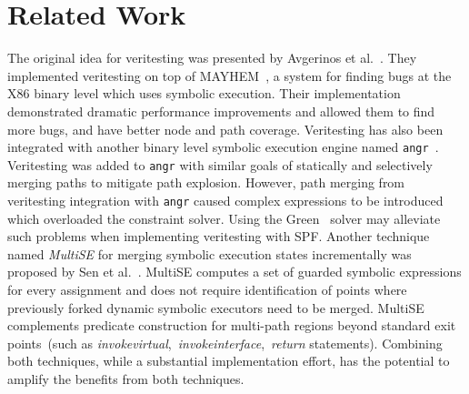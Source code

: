 \section{Related Work}
%
The original idea for veritesting was presented by Avgerinos et al.~\cite{veritesting}.
%
They implemented veritesting on top of MAYHEM~\cite{mayhem}, a system for finding bugs at the X86 binary level which uses symbolic execution.
%
Their implementation demonstrated dramatic performance improvements and allowed them to find more bugs, and have better node and path coverage.
%
Veritesting has also been integrated with another binary level symbolic execution engine named {\tt angr}~\cite{angr}.
%
Veritesting was added to {\tt angr} with similar goals of statically and selectively merging paths to mitigate path explosion.
%
However, path merging from veritesting integration with {\tt angr} caused complex expressions to be introduced which overloaded the constraint solver.
%
Using the Green~\cite{green} solver may alleviate such problems when implementing veritesting with SPF.
%
Another technique named \textit{MultiSE} for merging symbolic execution states incrementally
was proposed by Sen et al.~\cite{multise}.
%
MultiSE computes a set of guarded symbolic expressions for every
assignment and does not require identification of points where
previously forked dynamic symbolic executors need to be merged.
%
MultiSE complements predicate construction for multi-path regions beyond
standard exit points~(such as
\textit{invokevirtual},~\textit{invokeinterface},~\textit{return}
statements).
%
Combining both techniques, while a substantial implementation effort, has the potential
to amplify the benefits from both techniques.
%
%


